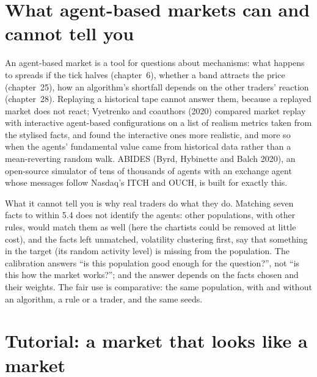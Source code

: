\section{What agent-based markets can and cannot tell you}

An agent-based market is a tool for questions about mechanisms: what happens to spreads if the tick halves (chapter~6), whether a band attracts the
price (chapter~25), how an algorithm's shortfall depends on the other traders' reaction (chapter~28). Replaying a historical tape cannot answer them,
because a replayed market does not react; Vyetrenko and coauthors (2020) compared market replay with interactive agent-based configurations on a list
of realism metrics taken from the stylised facts, and found the interactive ones more realistic, and more so when the agents' fundamental value came from
historical data rather than a mean-reverting random walk. ABIDES (Byrd, Hybinette and Balch 2020), an open-source simulator of tens of thousands of
agents with an exchange agent whose messages follow Nasdaq's ITCH and OUCH, is built for exactly this.

What it cannot tell you is why real traders do what they do. Matching seven facts to within 5.4 does not identify the agents: other populations,
with other rules, would match them as well (here the chartists could be removed at little cost), and the facts left unmatched, volatility clustering
first, say that something in the target (its random activity level) is missing from the population. The calibration answers ``is this population good
enough for the question?'', not ``is this how the market works?''; and the answer depends on the facts chosen and their weights. The fair use is
comparative: the same population, with and without an algorithm, a rule or a trader, and the same seeds.

\section{Tutorial: a market that looks like a market}\label{tut:mx:build-an-agent-based-market:tut}

